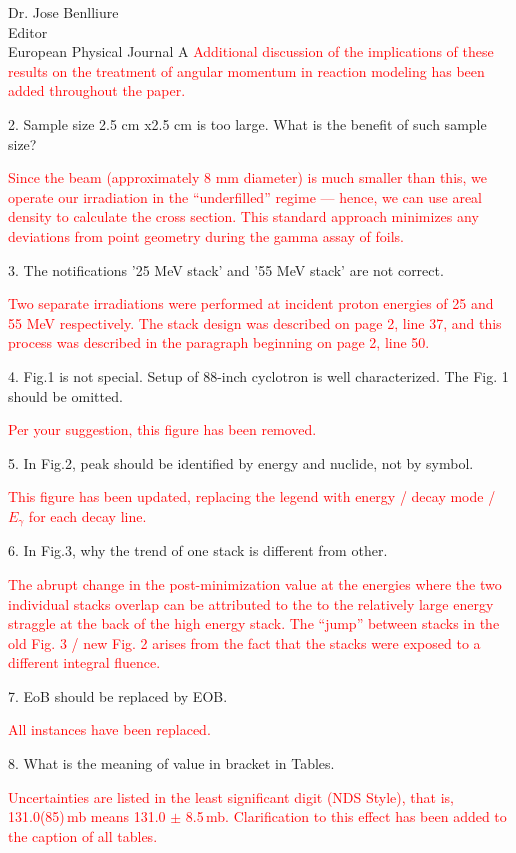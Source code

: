 \documentclass{letter} %
\newcommand{\colornote}[1]{\textcolor{red}{#1}}
\begin{document}
\begin{letter}{Dr. Jose Benlliure \\
Editor \\
European Physical Journal A}
\colornote{Additional discussion of the implications of these results on the treatment of angular momentum in reaction modeling has been added throughout the paper. }

2. Sample size 2.5 cm x2.5 cm is too large. What is the benefit of such sample size?

\colornote{Since the beam (approximately 8 mm diameter) is  much smaller than this, we operate our irradiation in the \enquote{underfilled} regime --- hence, we can use areal density to calculate the cross section. This standard approach minimizes any deviations from point geometry during the gamma assay of foils.  }

3. The notifications ’25 MeV stack’ and ’55 MeV stack’ are not correct.

\colornote{Two separate irradiations were performed at incident proton energies of 25 and 55 MeV respectively. The stack design was described on page 2, line 37, and this process was described in the paragraph beginning on page 2, line 50. }

4. Fig.1 is not special. Setup of 88-inch cyclotron is well characterized. The Fig. 1 should be
omitted.

\colornote{Per your suggestion, this figure has been removed.}

5. In Fig.2, peak should be identified by energy and nuclide, not by symbol.

\colornote{This figure has been updated, replacing the legend with energy / decay mode / $E_\gamma$ for each decay line.}

6. In Fig.3, why the trend of one stack is different from other.

\colornote{The abrupt change in the post-minimization value at the energies where the two individual stacks overlap can be attributed to the to the relatively large energy straggle at the back of the high energy stack. The \enquote{jump} between stacks in the old Fig. 3 /  new Fig. 2 arises from the fact that the stacks were exposed to a different integral fluence.}

7. EoB should be replaced by EOB.

\colornote{All instances have been replaced.}

8. What is the meaning of value in bracket in Tables.

\colornote{Uncertainties are listed in the least significant digit (NDS Style), that is, 131.0(85)\,mb  means 131.0 $\pm$ 8.5\,mb. Clarification to this effect has been added to the caption of all tables.}


\end{letter}
\end{document}
